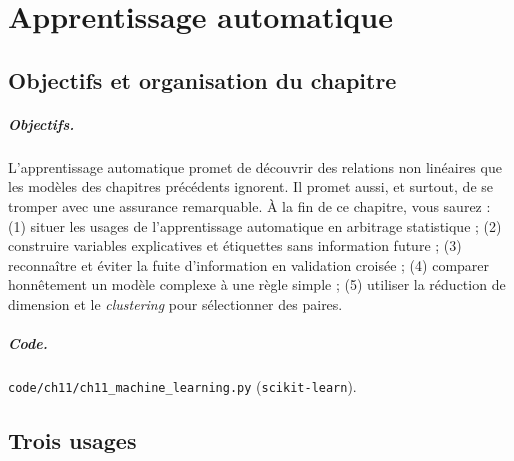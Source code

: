 \chapter{Apprentissage automatique}
\label{ch:11}

\section{Objectifs et organisation du chapitre}

\paragraph{Objectifs.} L'apprentissage automatique promet de découvrir des relations non linéaires que les modèles des chapitres précédents ignorent. Il promet aussi, et surtout, de se tromper avec une assurance remarquable. À la fin de ce chapitre, vous saurez : (1) situer les usages de l'apprentissage automatique en arbitrage statistique ; (2) construire variables explicatives et étiquettes sans information future ; (3) reconnaître et éviter la fuite d'information en validation croisée ; (4) comparer honnêtement un modèle complexe à une règle simple ; (5) utiliser la réduction de dimension et le \emph{clustering} pour sélectionner des paires.

\paragraph{Code.} \texttt{code/ch11/ch11\_machine\_learning.py} (\texttt{scikit-learn}).

\section{Trois usages}

